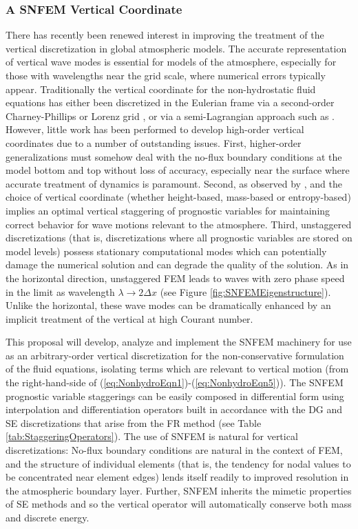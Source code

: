\documentclass[11pt]{article}
\begin{document}
\subsubsection{A SNFEM Vertical Coordinate} \label{sec:VerticalSNFEM}

There has recently been renewed interest in improving the treatment of the vertical discretization in global atmospheric models.  The accurate representation of vertical wave modes is essential for models of the atmosphere, especially for those with wavelengths near the grid scale, where numerical errors typically appear.  Traditionally the vertical coordinate for the non-hydrostatic fluid equations has either been discretized in the Eulerian frame via a second-order Charney-Phillips \citep{JGCNAP1953JAS} or Lorenz grid \citep{AASM1988JAS}, or via a semi-Lagrangian approach such as \cite{SJL2004MWR}.  However, little work has been performed to develop high-order vertical coordinates due to a number of outstanding issues.  First, higher-order generalizations must somehow deal with the no-flux boundary conditions at the model bottom and top without loss of accuracy, especially near the surface where accurate treatment of dynamics is paramount.  Second, as observed by \cite{JTTJW2005JCP}, \cite{JT2006QJRMS} and \cite{MDTRDA2007JCP} the choice of vertical coordinate (whether height-based, mass-based or entropy-based) implies an optimal vertical staggering of prognostic variables for maintaining correct behavior for wave motions relevant to the atmosphere.  Third, unstaggered discretizations (that is, discretizations where all prognostic variables are stored on model levels) possess stationary computational modes which can potentially damage the numerical solution and can degrade the quality of the solution.  As in the horizontal direction, unstaggered FEM leads to waves with zero phase speed in the limit as wavelength $\lambda \to 2 \Delta x$ (see Figure \ref{fig:SNFEMEigenstructure}).  Unlike the horizontal, these wave modes can be dramatically enhanced by an implicit treatment of the vertical at high Courant number.

This proposal will develop, analyze and implement the SNFEM machinery for use as an arbitrary-order vertical discretization for the non-conservative formulation of the fluid equations, isolating terms which are relevant to vertical motion (from the right-hand-side of (\ref{eq:NonhydroEqn1})-(\ref{eq:NonhydroEqn5})).  The SNFEM prognostic variable staggerings can be easily composed in differential form using interpolation and differentiation operators built in accordance with the DG and SE discretizations that arise from the FR method (see Table \ref{tab:StaggeringOperators}).  The use of SNFEM is natural for vertical discretizations:  No-flux boundary conditions are natural in the context of FEM, and the structure of individual elements (that is, the tendency for nodal values to be concentrated near element edges) lends itself readily to improved resolution in the atmospheric boundary layer.  Further, SNFEM inherits the mimetic properties of SE methods and so the vertical operator will automatically conserve both mass and discrete energy.
\end{document}
